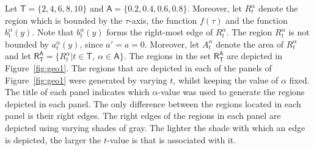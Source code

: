 \documentclass[twoside,reqno,11pt]{fcaa-var} %
\begin{document}


\noindent
Let $\mathsf{T}=\{2,4,6,8,10\}$ and $\mathsf{A} = \{0.2,0.4,0.6,0.8\}$. Moreover, let $R_{t}^{\alpha}$ denote the region which is bounded by the $\tau$-axis, the function $f(\tau)$ and the function $b_{t}^{\alpha}(y)$. Note that $b_{t}^{\alpha}(y)$ forms the 
right-most edge of $R_{t}^{\alpha}$. The region $R_{t}^{\alpha}$ is not bounded by $a_{t}^{\alpha}(y)$, since $a'=a=0$. Moreover, let $A_{t}^{\alpha}$ denote the area of $R_{t}^{\alpha}$ and let $\mathsf{R}_{\mathsf{T}}^{\mathsf{A}}=\{R_t^{\alpha}|t\in\mathsf{T},~\alpha\in\mathsf{A}\}$. The regions in the set $\mathsf{R}_{\mathsf{T}}^{\mathsf{A}}$ are depicted in Figure~\ref{fig:geo1}. The regions that are depicted in each of the panels of Figure~\ref{fig:geo1} were generated by varying $t$, whilst keeping the value of $\alpha$ fixed. The title of each panel indicates which $\alpha$-value was used to generate the regions depicted in each panel. The only difference between the regions located in each panel is their right edges. The right edges of the regions in each panel are depicted using varying shades of gray. The lighter the shade with which an edge is depicted, the larger the $t$-value is that is associated with it.\\
\end{document}
